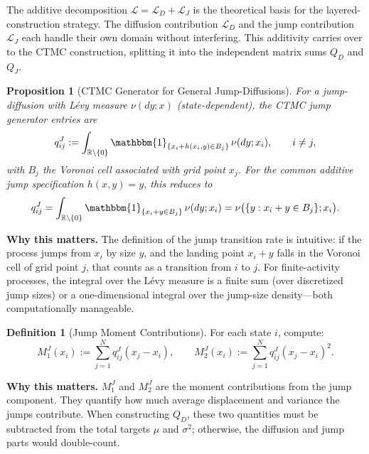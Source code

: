 \documentclass[11pt,a4paper,openany]{book}
\theoremstyle{definition}
\newtheorem{definition}{Definition}[chapter]
\theoremstyle{plain}
\newtheorem{proposition}[theorem]{Proposition}
\theoremstyle{remark}
\newcommand{\1}{\mathbbm{1}}
\newcommand{\R}{\mathbb{R}}
\begin{document}
The additive decomposition $\mathcal{L} = \mathcal{L}_{D} + \mathcal{L}_{J}$ is the theoretical basis for the layered-construction strategy. The diffusion contribution $\mathcal{L}_{D}$ and the jump contribution $\mathcal{L}_{J}$ each handle their own domain without interfering. This additivity carries over to the CTMC construction, splitting it into the independent matrix sums $Q_{D}$ and $Q_{J}$.

\begin{proposition}[CTMC Generator for General Jump-Diffusions]
For a jump-diffusion with L\'{e}vy measure $\nu(dy; x)$ (state-dependent), the CTMC jump generator entries are
\[
q_{ij}^{J} := \int_{\R \setminus \{0\}} \1_{\{x_{i} + h(x_{i}, y) \in B_{j}\}} \, \nu(dy; x_{i}), \qquad i \neq j,
\]
with $B_{j}$ the Voronoi cell associated with grid point $x_{j}$. For the common additive jump specification $h(x, y) = y$, this reduces to
\[
q_{ij}^{J} = \int_{\R \setminus \{0\}} \1_{\{x_{i} + y \in B_{j}\}} \, \nu(dy; x_{i}) = \nu\bigl(\{y : x_{i} + y \in B_{j}\}; x_{i}\bigr).
\]
\end{proposition}

\medskip
\noindent\textbf{Why this matters.} The definition of the jump transition rate is intuitive: if the process jumps from $x_i$ by size $y$, and the landing point $x_i + y$ falls in the Voronoi cell of grid point $j$, that counts as a transition from $i$ to $j$. For finite-activity processes, the integral over the L\'{e}vy measure is a finite sum (over discretized jump sizes) or a one-dimensional integral over the jump-size density---both computationally manageable.

\begin{definition}[Jump Moment Contributions]
For each state $i$, compute:
\[
M_{1}^{J}(x_{i}) := \sum_{j=1}^{N} q_{ij}^{J} (x_{j} - x_{i}), \qquad
M_{2}^{J}(x_{i}) := \sum_{j=1}^{N} q_{ij}^{J} (x_{j} - x_{i})^{2}.
\]
\end{definition}

\medskip
\noindent\textbf{Why this matters.} $M_1^J$ and $M_2^J$ are the moment contributions from the jump component. They quantify how much average displacement and variance the jumps contribute. When constructing $Q_D$, these two quantities must be subtracted from the total targets $\mu$ and $\sigma^2$; otherwise, the diffusion and jump parts would double-count.
\end{document}
